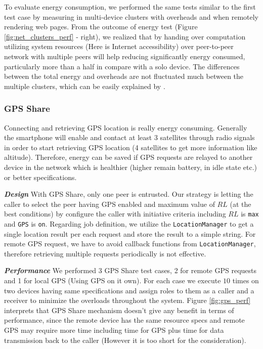 \documentclass{sig-alternate}[10pt]
\begin{document}
To evaluate energy consumption, we performed the same tests similar to the first test case by measuring in multi-device clusters with overheads and when remotely rendering web pages. From the outcome of energy test (Figure \ref{fig:net_clusters_perf} - right), we realized that by handing over computation utilizing system resources (Here is Internet accessibility) over peer-to-peer network with multiple peers will help reducing significantly energy consumed, particularly more than a half in compare with a solo device. The differences between the total energy and overheads are not fluctuated much between the multiple clusters, which can be easily explained by \cite{wifi_energy}.\\


\subsubsection{GPS Share}
Connecting and retrieving GPS location is really energy consuming. Generally the smartphone will enable and contact at least 3 satellites through radio signals in order to start retrieving GPS location (4 satellites to get more information like altitude). Therefore, energy can be saved if GPS requests are relayed to another device in the network which is healthier (higher remain battery, in idle state etc.) or better specifications.

\textbf{\emph{Design}}
With GPS Share, only one peer is entrusted. Our strategy is letting the caller to select the peer having GPS enabled and maximum value of $RL$ (at the best conditions) by configure the caller with initiative criteria including $RL$ is \texttt{max} and \texttt{GPS} is \texttt{on}. Regarding job definition, we utilize the \texttt{LocationManager} to get a single location result per each request and store the result to a simple string. For remote GPS request, we have to avoid callback functions from \texttt{LocationManager}, therefore retrieving multiple requests periodically is not effective.


\textbf{\emph{Performance}}
We performed 3 GPS Share test cases, 2 for remote GPS requests and 1 for local GPS (Using GPS on it own). For each case we execute $10$ times on two devices having same specifications and assign roles to them as a caller and a receiver to minimize the overloads throughout the system. Figure \ref{fig:gps_perf} interprets that GPS Share mechanism doesn't give any benefit in terms of performance, since the remote device has the same resource specs and remote GPS may require more time including time for GPS plus time for data transmission back to the caller (However it is too short for the consideration).
\end{document}
